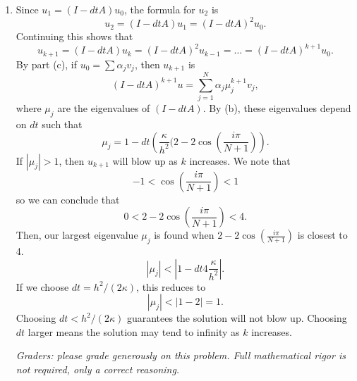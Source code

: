 {\begin{solution}
\begin{enumerate}
\[
A^nu = \sum_{j=1}^N \alpha_j \lambda_j^n v_j.  
\]
\item Since $u_1 = (I-dt A)u_0$, the formula for $u_2$ is 
\[
u_2 = (I-dt A)u_1 = (I-dt A)^2u_0.
\]
Continuing this shows that 
\[
u_{k+1} = (I-dt A)u_{k} = (I-dt A)^2 u_{k-1} = \ldots = (I-dt A)^{k+1} u_{0}.
\]
By part (c), if $u_0 = \sum \alpha_j v_j$, then $u_{k+1}$ is
\[
(I-dt A)^{k+1}u = \sum_{j=1}^N \alpha_j \mu_j^{k+1} v_j, 
\]
where $\mu_j$ are the eigenvalues of $(I-dt A)$.  By (b), these eigenvalues depend on $dt$ such that
\[
\mu_j = 1 - dt \left(\frac{\kappa}{h^2}(2-2\cos\left(\frac{i\pi}{N+1}\right)\right).
\]
If $|\mu_j| > 1$, then $u_{k+1}$ will blow up as $k$ increases.  We note that
\[
-1 < \cos\left(\frac{i\pi}{N+1}\right) < 1
\]
so we can conclude that 
\[
0 < 2-2\cos\left(\frac{i\pi}{N+1}\right) < 4.  
\]
Then, our largest eigenvalue $\mu_j$ is found when $2-2\cos\left(\frac{i\pi}{N+1}\right)$ is closest to 4.  
\[
|\mu_j | < \left| 1 - dt 4\frac{\kappa}{h^2} \right|.
\]
If we choose $dt = h^2/(2\kappa)$, this reduces to 
\[
|\mu_j | < \left| 1 - 2 \right| = 1.
\]
Choosing $dt < h^2/(2\kappa)$ guarantees the solution will not blow up.  Choosing $dt$ larger means the solution may tend to infinity as $k$ increases.  

\emph{Graders: please grade generously on this problem.  Full mathematical rigor is not required, only a correct reasoning.}


\end{enumerate}
\end{solution}
}{}
